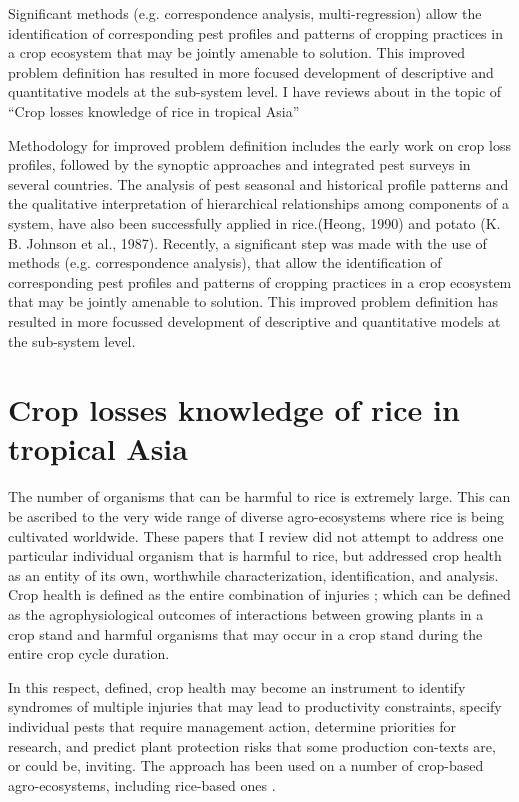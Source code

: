 Significant methods (e.g. correspondence analysis, multi-regression) allow the identification of corresponding pest profiles and patterns of cropping practices in a crop ecosystem that may be jointly amenable to solution. This improved problem definition has resulted in more focused development of descriptive and quantitative models at the sub-system level. I have reviews about in the topic of ``Crop losses knowledge of rice in tropical Asia''



Methodology for improved problem definition includes the early work on crop loss profiles, followed by the synoptic approaches and integrated
pest surveys in several countries. The analysis of pest seasonal and historical profile patterns and the qualitative interpretation of hierarchical relationships among components of a system, have also been successfully applied in rice.(Heong, 1990) and potato (K. B. Johnson et al., 1987). Recently, a significant step was made with the use of methods (e.g. correspondence analysis), that allow the identification of corresponding pest profiles and patterns of cropping practices in a crop ecosystem that may be jointly amenable to solution. This improved problem definition has resulted in more focussed development of descriptive and quantitative models at the sub-system level.

\section*{Crop losses knowledge of rice in tropical Asia}

The number of organisms that can be harmful to rice is extremely large. This can be ascribed to the very wide range of diverse agro-ecosystems where rice is being cultivated worldwide. These papers that I review did not attempt to address one particular individual organism that is harmful to rice, but addressed crop health as an entity of its own, worthwhile characterization, identification, and analysis. Crop health is defined as the entire combination of injuries \citep{Zadok1985}; which can be defined as the agrophysiological outcomes of interactions between growing plants in a crop stand and harmful organisms that may occur in a crop stand during the entire crop cycle duration. 

In this respect, defined, crop health may become an instrument to identify syndromes of multiple injuries that may lead to productivity constraints, specify individual pests that require management action, determine priorities for research, and predict plant protection risks that some production con-texts are, or could be, inviting. The approach has been used on a number of crop-based agro-ecosystems, including rice-based ones \citep{Savary:2006to}.

